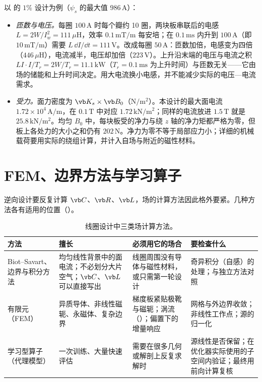 以 的 $1\%$ 设计为例（$\psi_s$ 的最大值 $986\,\mathrm A$）：
\begin{itemize}
\item \emph{匝数与电压。}每圈 $100\,\mathrm A$ 时每个瓣约 10 圈，两块板串联后的电感 $L=2W/I_w^2=111\,\mu\mathrm H$，效率 $0.1\,\mathrm{mT/m}$ 每安培；在 $0.1\,\mathrm{ms}$ 内升到 $100\,\mathrm A$（即 $10\,\mathrm{mT/m}$）需要 $L\,\dd I/\dd t=111\,\mathrm V$。改成每圈 $50\,\mathrm A$：匝数加倍，电感变为四倍（$446\,\mu\mathrm H$），电流减半，电压却加倍（$223\,\mathrm V$）。上升沿末端的电压与电流之积 $LI\cdot I/T_r=2W/T_r=11.1\,\mathrm{kW}$（$T_r=0.1\,\mathrm{ms}$ 为上升时间）与匝数无关——它由场的储能和上升时间决定。用大电流换小电感，并不能减少实际的电压—电流需求。
\item \emph{受力。}面力密度为 $\vb K_s\times\vb B_0$（$\mathrm{N/m^2}$）。本设计的最大面电流 $1.72\times10^4\,\mathrm{A/m}$，在 $0.1\,\mathrm T$ 中对应 $1.72\,\mathrm{kN/m^2}$；同样的电流放进 $1.5\,\mathrm T$ 就是 $25.8\,\mathrm{kN/m^2}$。均匀 $B_0$ 中，每块板受的净力与绕 $z$ 轴的净力矩都严格为零，但板上各处力的大小之和仍有 $202\,\mathrm N$。净力为零不等于局部应力小；详细的机械载荷要用实际的绕组计算，并计入自场与附近的磁性材料。
\end{itemize}

\section{FEM、边界方法与学习算子}\label{sec:coils-methods}

逆向设计要反复计算 $\vb C$、$\vb R$、$\vb L$，场的计算方法因此格外要紧。几种方法各有适用的位置（）。

\begin{table}[htbp]\centering\small
\caption{线圈设计中三类场计算方法。}\label{tab:coils-methods}
\begin{tabularx}{\linewidth}{@{}>{\raggedright\arraybackslash}p{.17\linewidth} Y Y Y@{}}
\toprule
方法 & 擅长 & 必须用它的场合 & 要检查什么\\\midrule
Biot--Savart、边界与积分方法 & 均匀线性背景中的面电流；不必划分大片空气；$\vb C$、$\vb L$ 可以直接写出 & 线圈周围没有导体与磁性材料，或只需第一轮设计 & 奇异积分（自感）的处理；与独立方法对照\\
有限元（FEM） & 异质导体、非线性磁轭、永磁体、复杂边界~\cite{mfem} & 梯度板紧贴极靴与磁轭；涡流（）；偏置下的增量响应 & 网格与外边界收敛；非线性工作点；源的归一化\\
学习型算子（代理模型） & 一次训练、大量快速评估 & 需要在很多几何或解剖上反复求解时 & 源线性是否保留；在优化器实际使用的子空间内验证；最终用前向计算复核\\
\bottomrule
\end{tabularx}
\end{table}


